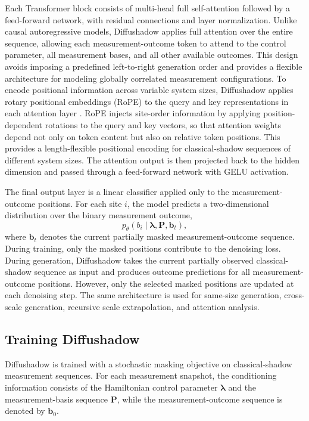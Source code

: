 \documentclass[pdflatex,sn-mathphys-num]{sn-jnl}%
\theoremstyle{thmstyleone}%
\theoremstyle{thmstyletwo}%
\theoremstyle{thmstylethree}%
\begin{document}
Each Transformer block consists of multi-head full self-attention followed by a feed-forward network, with residual connections and layer normalization. Unlike causal autoregressive models, Diffushadow applies full attention over the entire sequence, allowing each measurement-outcome token to attend to the control parameter, all measurement bases, and all other available outcomes. This design avoids imposing a predefined left-to-right generation order and provides a flexible architecture for modeling globally correlated measurement configurations.
To encode positional information across variable system sizes, Diffushadow applies rotary positional embeddings (RoPE) to the query and key representations in each attention layer \cite{su2024roformer}. RoPE injects site-order information by applying position-dependent rotations to the query and key vectors, so that attention weights depend not only on token content but also on relative token positions. This provides a length-flexible positional encoding for classical-shadow sequences of different system sizes. The attention output is then projected back to the hidden dimension and passed through a feed-forward network with GELU activation.

The final output layer is a linear classifier applied only to the measurement-outcome positions. For each site \(i\), the model predicts a two-dimensional distribution over the binary measurement outcome,
\begin{equation}
p_\theta(b_i \mid \boldsymbol{\lambda}, \mathbf{P}, \mathbf{b}_t),
\end{equation}
where \(\mathbf{b}_t\) denotes the current partially masked measurement-outcome sequence. During training, only the masked positions contribute to the denoising loss. During generation, Diffushadow takes the current partially observed classical-shadow sequence as input and produces outcome predictions for all measurement-outcome positions. However, only the selected masked positions are updated at each denoising step. The same architecture is used for same-size generation, cross-scale generation, recursive scale extrapolation, and attention analysis.





\subsection{Training Diffushadow}
\label{sec:method_training}

Diffushadow is trained with a stochastic masking objective on classical-shadow measurement sequences. For each measurement snapshot, the conditioning information consists of the Hamiltonian control parameter \(\boldsymbol{\lambda}\) and the measurement-basis sequence \(\mathbf{P}\), while the measurement-outcome sequence is denoted by \(\mathbf{b}_0\). 
\end{document}
